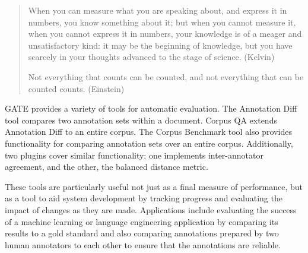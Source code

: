 
%




%


%
%
%
%



\ifprintedbook
\else
\begin{quote}
When you can measure what you are speaking about, and
express it in numbers, you know something about it; but when
you cannot measure it, when you cannot express it in numbers, your
knowledge is of a meager and unsatisfactory kind: it
may be the beginning of knowledge, but you have scarcely in your
thoughts advanced to the stage of science. (Kelvin)

Not everything that counts can be counted, and not everything that can
be counted counts. (Einstein) 
\end{quote}
\fi


GATE provides a variety of tools for automatic evaluation. The Annotation Diff
tool compares two annotation sets within a document. Corpus QA extends Annotation
Diff to an entire corpus. The Corpus Benchmark tool also provides
functionality for comparing annotation sets over an entire corpus. Additionally,
two plugins cover similar functionality; one implements inter-annotator
agreement, and the other, the balanced distance metric.

These tools are particularly useful not just as a final measure of performance,
but as a tool to aid system development by tracking progress and evaluating the
impact of changes as they are made. Applications include evaluating the success
of a machine learning or language engineering application by comparing its
results to a gold standard and also comparing annotations prepared by two
human annotators to each other to ensure that the annotations are reliable.

